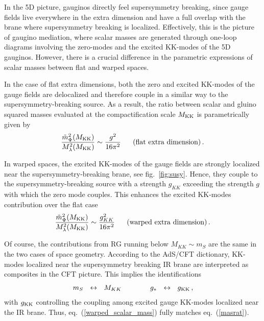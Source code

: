 \documentclass[a4paper,12pt]{article}
\newcommand{\beq}{\begin{equation}}
\newcommand{\eeq}{\end{equation}}
\def\eq#1{eq.~(\ref{#1})}
\def\fig#1{fig.~\ref{#1}}
\def\eq#1{eq.~(\ref{#1})}
\def\fig#1{fig.~\ref{#1}}
\def\mS{m_S}
\begin{document}
In the 5D picture, gauginos directly feel supersymmetry breaking, since gauge fields live everywhere in the extra dimension and have a full overlap with the brane where supersymmetry breaking is localized. 
Effectively, this is the picture of gaugino mediation, where scalar masses are generated through one-loop diagrams involving the zero-modes and the excited KK-modes of the 5D gauginos. 
However, there is a crucial difference in the parametric expressions of scalar masses between flat and warped spaces.

In the case of flat extra dimensions, both the zero and excited KK-modes of the gauge fields are delocalized and therefore couple in a similar way to the supersymmetry-breaking source. As a result, the ratio between scalar and gluino squared masses evaluated at the compactification scale $M_{ \rm KK }$ is parametrically given by
\beq
 \frac{ \tilde{m}_\Phi^2 (M_{ \rm KK } )}{ M_{\lambda}^2 (M_{ \rm KK } ) }  \sim  \frac{ g^2 }{ 16 \pi^2 } ~~~~~{\rm (flat~extra~dimension)} \, .
\label{flat_scalar_mass}
\eeq

In warped spaces, the excited KK-modes of the gauge fields are strongly localized near the supersymmetry-breaking brane, see \fig{fig:susy}. Hence, they couple to the supersymmetry-breaking source with a strength $g_{ KK }$ exceeding  the  strength $g$ with which the zero mode couples. This enhances   the  excited KK-modes contribution over the flat case
\beq
 \frac{ \tilde{m}_\Phi^2 (M_{ \rm KK } )}{ M_{\lambda}^2 (M_{ \rm KK } ) }  \sim  \frac{ g_{ KK }^2 }{ 16 \pi^2 } ~~~~~{\rm (warped~extra~dimension)} \, .
\label{warped_scalar_mass}
\eeq

Of course, the contributions from RG running below $M_{KK}\sim \mS$ are the same in the two cases of space geometry. According to the AdS/CFT dictionary, KK-modes localized near the supersymmetry breaking IR brane are interpreted as composites in the CFT picture. This implies the identifications
\beq
\mS~~ \leftrightarrow ~~   M_{KK} \qquad\qquad g_*  ~~ \leftrightarrow ~~ g_{ \rm KK }  \, ,
\eeq
with $g_{ \rm KK }$ controlling  the coupling among excited gauge KK-modes localized near the IR brane.
Thus, \eq{warped_scalar_mass} fully matches \eq{masrat}.
\end{document}
